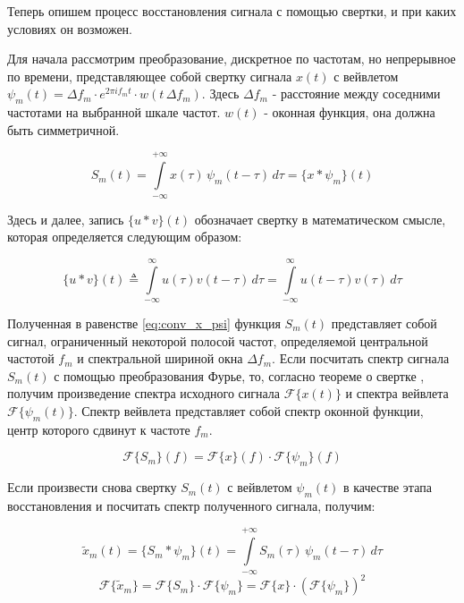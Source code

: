 Теперь опишем процесс восстановления сигнала с помощью свертки, и при каких условиях он возможен.

Для начала рассмотрим преобразование, дискретное по частотам, но непрерывное по времени, 
представляющее собой свертку сигнала $x(t)$ с вейвлетом $\psi_m(t) = \Delta f_m \cdot e^{2\pi i f_m t} \cdot w(t\,\Delta f_m)$.
Здесь $\Delta f_m$ - расстояние между соседними частотами на выбранной шкале частот. $w(t)$ - оконная функция, она должна быть симметричной.

\begin{equation}
  S_m(t)=\int \limits _{-\infty}^{+\infty}x(\tau)\,\psi_m(t - \tau)\,d\tau = \{x * \psi_m\}(t)
  \label{eq:conv_x_psi}
\end{equation}

Здесь и далее, запись $\{u*v\}(t)$ обозначает свертку в математическом смысле, которая определяется следующим образом:

\begin{equation}
  \{u*v\}(t)\triangleq \int \limits_{-\infty }^{\infty }u(\tau )v(t-\tau )\,d\tau = \int \limits_{-\infty }^{\infty }u(t-\tau )v(\tau )\,d\tau
\end{equation}

Полученная в равенстве \ref{eq:conv_x_psi} функция $S_m(t)$ представляет собой сигнал, ограниченный некоторой полосой частот, 
определяемой центральной частотой $f_m$ и спектральной шириной окна $\Delta f_m$.
Если посчитать спектр сигнала $S_m(t)$ с помощью преобразования Фурье, то, согласно теореме о свертке \cite{conv_theorem}, 
получим произведение спектра исходного сигнала $\mathcal{F}\{x(t)\}$ и спектра вейвлета $\mathcal{F}\{\psi_m(t)\}$.
Спектр вейвлета представляет собой спектр оконной функции, центр которого сдвинут к частоте $f_m$.

\begin{equation}
  \mathcal{F}\{S_m\}(f) = \mathcal{F}\{x\}(f) \cdot \mathcal{F}\{\psi_m\}(f)
\end{equation}

Если произвести снова свертку $S_m(t)$ с вейвлетом $\psi_m(t)$ в качестве этапа восстановления и посчитать спектр полученного сигнала, получим:

\begin{equation}
  \tilde{x}_m(t) = \{S_m * \psi_m\}(t) = \int \limits _{-\infty}^{+\infty} S_m(\tau)\,\psi_m(t - \tau)\,d\tau
\end{equation}
\begin{equation}
  \mathcal{F}\{\tilde{x}_m\} = \mathcal{F}\{S_m\} \cdot \mathcal{F}\{\psi_m\} = \mathcal{F}\{x\} \cdot (\mathcal{F}\{\psi_m\})^2
\end{equation}


